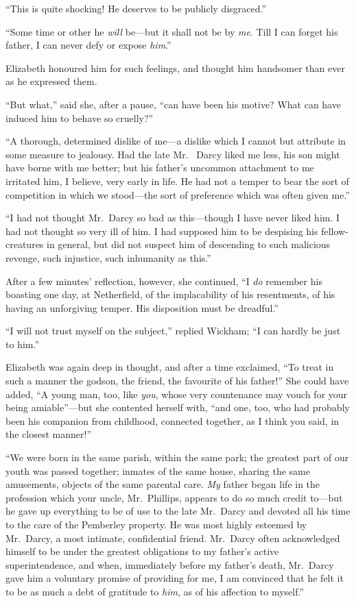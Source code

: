 ``This is quite shocking!  He deserves to be publicly disgraced.''

``Some time or other he \emph{will} be---but it shall not be by \emph{me}.
Till I can forget his father, I can never defy or expose \emph{him}.''

Elizabeth honoured him for such feelings, and thought him
handsomer than ever as he expressed them.

``But what,'' said she, after a pause, ``can have been his motive?
What can have induced him to behave so cruelly?''

``A thorough, determined dislike of me---a dislike which I cannot
but attribute in some measure to jealousy.  Had the late Mr.\ %
Darcy liked me less, his son might have borne with me better;
but his father's uncommon attachment to me irritated him, I
believe, very early in life.  He had not a temper to bear the sort of
competition in which we stood---the sort of preference which
was often given me.''

``I had not thought Mr.\ Darcy so bad as this---though I have
never liked him.  I had not thought so very ill of him.  I had
supposed him to be despising his fellow-creatures in general, but
did not suspect him of descending to such malicious revenge,
such injustice, such inhumanity as this.''

After a few minutes' reflection, however, she continued,
``I \emph{do} remember his boasting one day, at Netherfield, of the
implacability of his resentments, of his having an unforgiving
temper.  His disposition must be dreadful.''

``I will not trust myself on the subject,'' replied Wickham; ``I
can hardly be just to him.''

Elizabeth was again deep in thought, and after a time exclaimed,
``To treat in such a manner the godson, the friend, the favourite
of his father!''  She could have added, ``A young man, too,
like \emph{you}, whose very countenance may vouch for your being
amiable''---but she contented herself with, ``and one, too, who
had probably been his companion from childhood, connected
together, as I think you said, in the closest manner!''

``We were born in the same parish, within the same park; the
greatest part of our youth was passed together; inmates of the
same house, sharing the same amusements, objects of the same
parental care.  \emph{My} father began life in the profession which
your uncle, Mr.\ Phillips, appears to do so much credit to---but
he gave up everything to be of use to the late Mr.\ Darcy and
devoted all his time to the care of the Pemberley property.
He was most highly esteemed by Mr.\ Darcy, a most intimate,
confidential friend.  Mr.\ Darcy often acknowledged himself
to be under the greatest obligations to my father's active
superintendence, and when, immediately before my father's
death, Mr.\ Darcy gave him a voluntary promise of providing for
me, I am convinced that he felt it to be as much a debt of
gratitude to \emph{him}, as of his affection to myself.''

